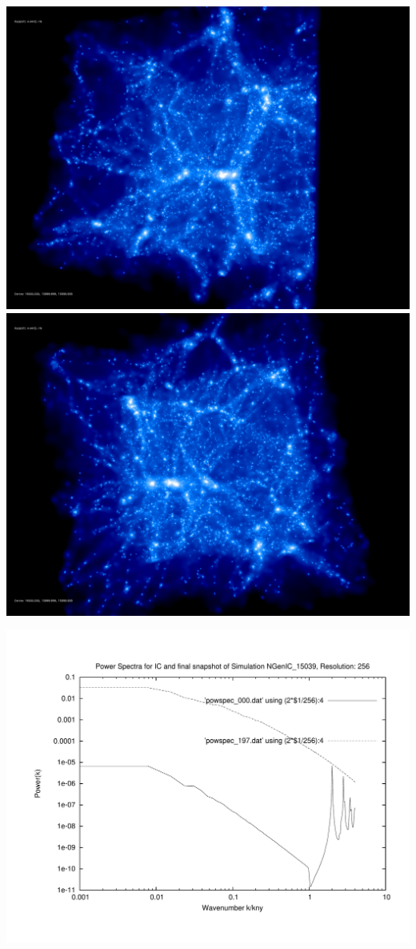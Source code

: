\includegraphics[scale=0.1]{r256/h100/NGenIC_15039/rotate_00074.jpg} 
\includegraphics[scale=0.1]{r256/h100/NGenIC_15039/rotate_00131.jpg}

\includegraphics[scale=0.5]{r256/h100/NGenIC_15039/plot_powspec_NGenIC_15039}

